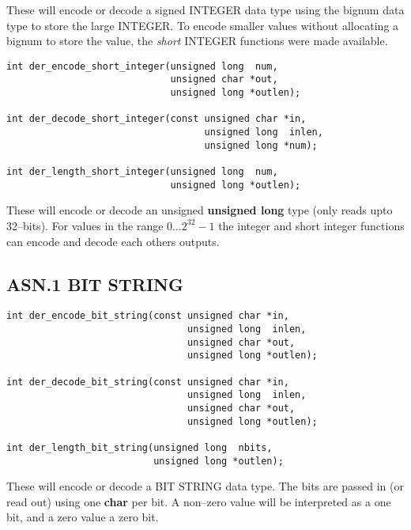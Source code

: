 \documentclass[synpaper]{book}
\begin{document}
These will encode or decode a signed INTEGER data type using the bignum data type to store the large INTEGER.  To encode smaller values without allocating
a bignum to store the value, the \textit{short} INTEGER functions were made available.

\begin{verbatim}
int der_encode_short_integer(unsigned long  num,
                             unsigned char *out,
                             unsigned long *outlen);

int der_decode_short_integer(const unsigned char *in,
                                   unsigned long  inlen,
                                   unsigned long *num);

int der_length_short_integer(unsigned long  num,
                             unsigned long *outlen);
\end{verbatim}

These will encode or decode an unsigned \textbf{unsigned long} type (only reads upto 32--bits).  For values in the range $0 \dots 2^{32} - 1$ the integer
and short integer functions can encode and decode each others outputs.

\subsection{ASN.1 BIT STRING}

\begin{verbatim}
int der_encode_bit_string(const unsigned char *in,
                                unsigned long  inlen,
                                unsigned char *out,
                                unsigned long *outlen);

int der_decode_bit_string(const unsigned char *in,
                                unsigned long  inlen,
                                unsigned char *out,
                                unsigned long *outlen);

int der_length_bit_string(unsigned long  nbits,
                          unsigned long *outlen);
\end{verbatim}

These will encode or decode a BIT STRING data type.  The bits are passed in (or read out) using one \textbf{char} per bit.  A non--zero value will be interpreted
as a one bit, and a zero value a zero bit.
\end{document}
